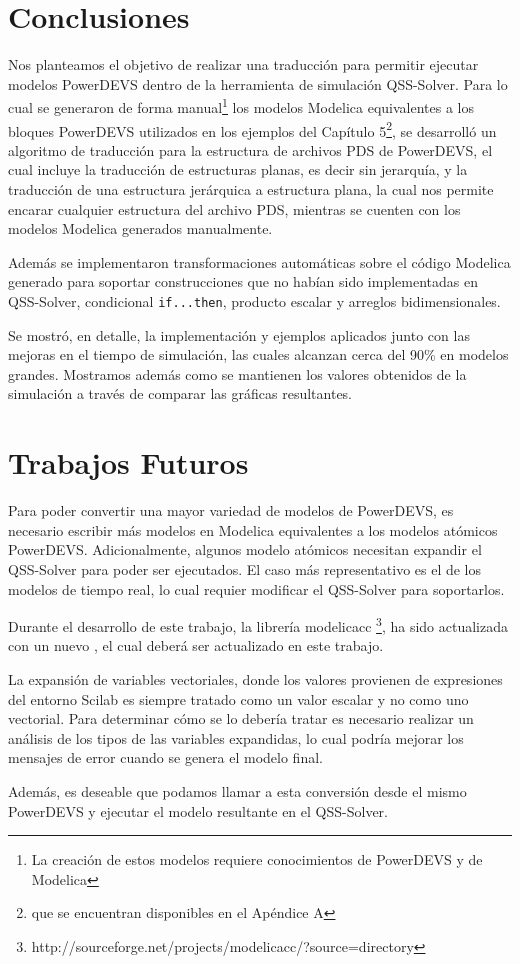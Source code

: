 
\section{Conclusiones}

	Nos planteamos el objetivo de realizar una traducción para permitir ejecutar modelos PowerDEVS dentro de la herramienta de simulación QSS-Solver. 
	Para lo cual se generaron de forma manual\footnote{La creación de estos modelos requiere conocimientos de PowerDEVS y de Modelica} los modelos 
	Modelica equivalentes a los bloques PowerDEVS utilizados en los ejemplos del Capítulo 5\footnote{que se encuentran disponibles en el Apéndice A},
        se desarrolló un algoritmo de traducción para la estructura de archivos PDS de PowerDEVS, el cual incluye la traducción de estructuras planas,
	 es decir sin jerarquía, y la traducción de una estructura jerárquica a estructura plana, la cual nos permite encarar cualquier estructura 
	del archivo PDS, mientras se cuenten con los modelos Modelica generados manualmente. 
	
	Además se implementaron transformaciones automáticas 
	sobre el código Modelica generado para soportar construcciones que no habían sido implementadas en QSS-Solver, condicional \texttt{if...then}, 
	producto escalar y arreglos bidimensionales.

	Se mostró, en detalle, la implementación y ejemplos aplicados junto con las mejoras en el tiempo de simulación, las cuales alcanzan cerca del 90\%
	 en modelos grandes. Mostramos además como se mantienen los valores obtenidos de la simulación a través de comparar las gráficas resultantes.

\section{Trabajos Futuros}
	Para poder convertir una mayor variedad de modelos de PowerDEVS, es necesario escribir más modelos en Modelica equivalentes a los modelos atómicos PowerDEVS.
	Adicionalmente, algunos modelo atómicos necesitan expandir el QSS-Solver para poder ser ejecutados. El caso más representativo es el de los modelos de tiempo
	 real, lo cual requier modificar el QSS-Solver para soportarlos.

	Durante el desarrollo de este trabajo, la librería modelicacc \footnote{http://sourceforge.net/projects/modelicacc/?source=directory}, ha sido actualizada 
	con un nuevo , el cual deberá ser actualizado en este trabajo.

	La expansión de variables vectoriales, donde los valores provienen de expresiones del entorno Scilab es siempre tratado como un valor escalar y no como 
	uno vectorial. Para determinar cómo se lo debería tratar es necesario realizar un análisis de los tipos de las variables expandidas, lo cual podría mejorar
	los mensajes de error cuando se genera el modelo final.

	Además, es deseable que podamos llamar a esta conversión desde el mismo PowerDEVS y ejecutar el modelo resultante en el QSS-Solver.

